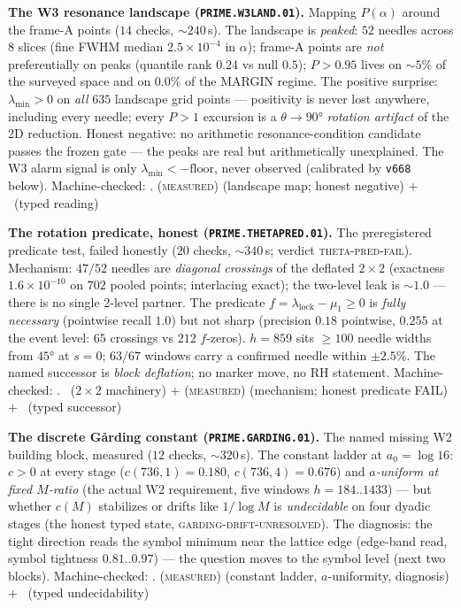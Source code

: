 \documentclass[11pt,a4paper]{article}
\theoremstyle{definition}
\begin{document}
\par\smallskip\noindent\textbf{The W3 resonance landscape
(\texttt{PRIME.W3LAND.01}).}
Mapping $P(\alpha)$ around the frame-A points ($14$ checks,
${\sim}240$\,s).  The landscape is \emph{peaked}: $52$ needles
across $8$ slices (fine FWHM median $2.5\times10^{-4}$ in $\alpha$);
frame-A points are \emph{not} preferentially on peaks (quantile rank
$0.24$ vs null $0.5$); $P>0.95$ lives on ${\sim}5\%$ of the surveyed
space and on $0.0\%$ of the MARGIN regime.  The positive surprise:
$\lambda_{\min}>0$ on \emph{all} $635$ landscape grid points ---
positivity is never lost anywhere, including every needle; every
$P>1$ excursion is a $\theta\to90°$ \emph{rotation artifact} of the
2D reduction.  Honest negative: no arithmetic resonance-condition
candidate passes the frozen gate --- the peaks are real but
arithmetically unexplained.  The W3 alarm signal is only
$\lambda_{\min}<-\mathrm{floor}$, never observed (calibrated by
\texttt{v668} below).
Machine-checked: .
(\textsc{measured}) (landscape map; honest negative) $+$ \mC\ (typed
reading)
\par\smallskip

\par\smallskip\noindent\textbf{The rotation predicate, honest
(\texttt{PRIME.THETAPRED.01}).}
The preregistered predicate test, failed honestly ($20$ checks,
${\sim}340$\,s; verdict \textsc{theta-pred-fail}).  Mechanism:
$47/52$ needles are \emph{diagonal crossings} of the deflated
$2\times2$ (exactness $1.6\times10^{-10}$ on $702$ pooled points;
interlacing exact); the two-level leak is ${\sim}1.0$ --- there is
no single 2-level partner.  The predicate
$f=\lambda_{\mathrm{lock}}-\mu_1\ge0$ is \emph{fully necessary}
(pointwise recall $1.0$) but not sharp (precision $0.18$ pointwise,
$0.255$ at the event level: $65$ crossings vs $212$ $f$-zeros).
$h=859$ sits $\ge100$ needle widths from $45°$ at $s=0$; $63/67$
windows carry a confirmed needle within $\pm2.5\%$.  The named
successor is \emph{block deflation}; no marker move, no RH
statement.
Machine-checked: .
\mE\ ($2\times2$ machinery) $+$ (\textsc{measured}) (mechanism;
honest predicate FAIL) $+$ \mC\ (typed successor)
\par\smallskip

\par\smallskip\noindent\textbf{The discrete G\aa rding constant
(\texttt{PRIME.GARDING.01}).}
The named missing W2 building block, measured ($12$ checks,
${\sim}320$\,s).  The constant ladder at $a_0=\log16$: $c>0$ at
every stage ($c(736,1)=0.180$, $c(736,4)=0.676$) and
\emph{$a$-uniform at fixed $M$-ratio} (the actual W2 requirement,
five windows $h=184..1433$) --- but whether $c(M)$ stabilizes or
drifts like $1/\log M$ is \emph{undecidable} on four dyadic stages
(the honest typed state, \textsc{garding-drift-unresolved}).  The
diagnosis: the tight direction reads the symbol minimum near the
lattice edge (edge-band read, symbol tightness $0.81..0.97$) --- the
question moves to the symbol level (next two blocks).
Machine-checked: .
(\textsc{measured}) (constant ladder, $a$-uniformity, diagnosis)
$+$ \mC\ (typed undecidability)
\par\smallskip
\end{document}
